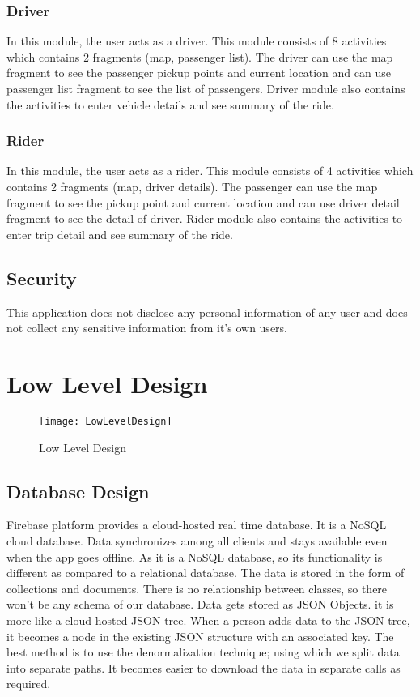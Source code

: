 \subsubsection{Driver}
In this module, the user acts as a driver. This module consists of 8 activities which contains 2 fragments (map, passenger list). The driver can use the map fragment to see the passenger pickup points and current location and can use passenger list fragment to see the list of passengers. Driver module also contains the activities to enter vehicle details and see summary of the ride.

\subsubsection{Rider}
In this module, the user acts as a rider. This module consists of 4 activities which contains 2 fragments (map, driver details). The passenger can use the map fragment to see the pickup point and current location and can use driver detail fragment to see the detail of driver. Rider module also contains the activities to enter trip detail and see summary of the ride.

\subsection{Security} 		
This application does not disclose any personal information of any user and does not collect any sensitive information from it's own users.

\section{Low Level Design}
\begin{figure}[!h]
\texttt{[image: LowLevelDesign]}
\caption{Low Level Design}
\label{fig:Low Level Design}
\end{figure} 

\subsection{Database Design}
Firebase platform provides a cloud-hosted real time database. It is a NoSQL cloud database. Data synchronizes among all clients and stays available even when the app goes offline. As it is a NoSQL database, so its functionality is different as compared to a relational database. The data is stored in the form of collections and documents. There is no relationship between classes, so there won’t be any schema of our database. Data gets stored as JSON Objects. it is more like a cloud-hosted JSON tree. When a person adds data to the JSON tree, it becomes a node in the existing JSON structure with an associated key. The best method is to use the denormalization technique; using which we split data into separate paths. It becomes easier to download the data in separate calls as required.

